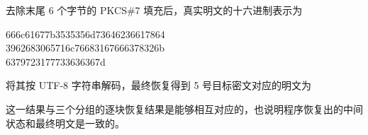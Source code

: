 去除末尾 6 个字节的 PKCS\#7 填充后，真实明文的十六进制表示为
\begin{center}
    \ttfamily\small
    666c61677b3535356d73646236617864\\
    3962683065716c76683167666378326b\\
    6379723177733636367d
\end{center}

将其按 UTF-8 字符串解码，最终恢复得到 5 号目标密文对应的明文为
\begin{center}
\end{center}

这一结果与三个分组的逐块恢复结果是能够相互对应的，也说明程序恢复出的中间状态和最终明文是一致的。
